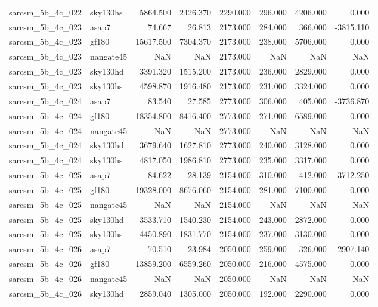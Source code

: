 \begin{tabular}{llrrrrrr}
sarcsm\_5b\_4c\_022 & sky130hs & 5864.500 & 2426.370 & 2290.000 & 296.000 & 4206.000 & 0.000 \\
sarcsm\_5b\_4c\_023 & asap7 & 74.667 & 26.813 & 2173.000 & 284.000 & 366.000 & -3815.110 \\
sarcsm\_5b\_4c\_023 & gf180 & 15617.500 & 7304.370 & 2173.000 & 238.000 & 5706.000 & 0.000 \\
sarcsm\_5b\_4c\_023 & nangate45 & NaN & NaN & 2173.000 & NaN & NaN & NaN \\
sarcsm\_5b\_4c\_023 & sky130hd & 3391.320 & 1515.200 & 2173.000 & 236.000 & 2829.000 & 0.000 \\
sarcsm\_5b\_4c\_023 & sky130hs & 4598.870 & 1916.480 & 2173.000 & 231.000 & 3324.000 & 0.000 \\
sarcsm\_5b\_4c\_024 & asap7 & 83.540 & 27.585 & 2773.000 & 306.000 & 405.000 & -3736.870 \\
sarcsm\_5b\_4c\_024 & gf180 & 18354.800 & 8416.400 & 2773.000 & 271.000 & 6589.000 & 0.000 \\
sarcsm\_5b\_4c\_024 & nangate45 & NaN & NaN & 2773.000 & NaN & NaN & NaN \\
sarcsm\_5b\_4c\_024 & sky130hd & 3679.640 & 1627.810 & 2773.000 & 240.000 & 3128.000 & 0.000 \\
sarcsm\_5b\_4c\_024 & sky130hs & 4817.050 & 1986.810 & 2773.000 & 235.000 & 3317.000 & 0.000 \\
sarcsm\_5b\_4c\_025 & asap7 & 84.622 & 28.139 & 2154.000 & 310.000 & 412.000 & -3712.250 \\
sarcsm\_5b\_4c\_025 & gf180 & 19328.000 & 8676.060 & 2154.000 & 281.000 & 7100.000 & 0.000 \\
sarcsm\_5b\_4c\_025 & nangate45 & NaN & NaN & 2154.000 & NaN & NaN & NaN \\
sarcsm\_5b\_4c\_025 & sky130hd & 3533.710 & 1540.230 & 2154.000 & 243.000 & 2872.000 & 0.000 \\
sarcsm\_5b\_4c\_025 & sky130hs & 4450.890 & 1831.770 & 2154.000 & 237.000 & 3130.000 & 0.000 \\
sarcsm\_5b\_4c\_026 & asap7 & 70.510 & 23.984 & 2050.000 & 259.000 & 326.000 & -2907.140 \\
sarcsm\_5b\_4c\_026 & gf180 & 13859.200 & 6559.260 & 2050.000 & 216.000 & 4575.000 & 0.000 \\
sarcsm\_5b\_4c\_026 & nangate45 & NaN & NaN & 2050.000 & NaN & NaN & NaN \\
sarcsm\_5b\_4c\_026 & sky130hd & 2859.040 & 1305.000 & 2050.000 & 192.000 & 2290.000 & 0.000 \\

\end{tabular}
